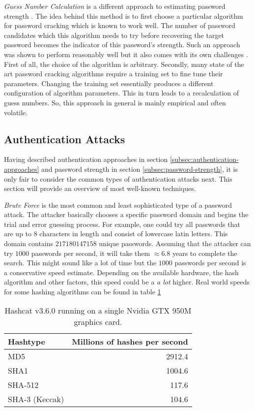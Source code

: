 \emph{Guess Number Calculation} is a different approach to estimating password strength \cite{kelley2012guess}. The idea behind this method is to first choose a particular algorithm for password cracking which is known to work well. The number of password candidates which this algorithm needs to try before recovering the target password becomes the indicator of this password's strength. Such an approach was shown to perform reasonably well but it also comes with its own challenges \cite{weir2010testing, zhang2010security}. First of all, the choice of the algorithm is arbitrary. Secondly, many state of the art password cracking algorithms require a training set to fine tune their parameters. Changing the training set essentially produces a different configuration of algorithm parameters. This in turn leads to a recalculation of guess numbers. So, this approach in general is mainly empirical and often volatile.

\subsection{Authentication Attacks}
\label{subsec:authentication-attacks}

Having described authentication approaches in section \ref{subsec:authentication-approaches} and password strength in section \ref{subsec:password-strength}, it is only fair to consider the common types of authentication attacks next. This section will provide an overview of most well-known techniques.

\emph{Brute Force} is the most common and least sophisticated type of a password attack. The attacker basically chooses a specific password domain and begins the trial and error guessing process. For example, one could try all passwords that are up to 8 characters in length and consist of lowercase latin letters. This domain contains \(217180147158\) unique passwords. Assuming that the attacker can try \(1000\) passwords per second, it will take them \(\approx 6.8\) years to complete the search. This might sound like a lot of time but the \(1000\) passwords per second is a conservative speed estimate. Depending on the available hardware, the hash algorithm and other factors, this speed could be a \emph{a lot} higher. Real world speeds for some hashing algorithms can be found in table \ref{table:hashcat-speed}

\begin{table}
    \begin{center}
        \begin{tabular}{lr}
            Hashtype & Millions of hashes per second \\
            \hline
            MD5 & 2912.4 \\
            SHA1 & 1004.6 \\
            SHA-512 & 117.6 \\
            SHA-3 (Keccak) & 104.6
          \end{tabular}
      \end{center}
      \caption{Hashcat v3.6.0 running on a single Nvidia GTX 950M graphics card.}
      \label{table:hashcat-speed}
  \end{table}

